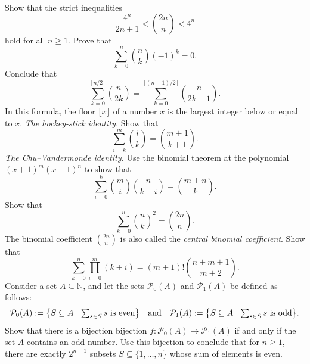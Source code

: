 \begin{routine}
  \exercise \label{exercise:estimates-central-binomial-coefficients}Show that the strict inequalities
  \begin{equation*}
    \frac{4^n}{2n+1} < \binom{2n}{n} < 4^n
  \end{equation*}
  hold for all $n\geq 1$.
  \exercise Prove that
  \begin{equation*}
    \sum_{k=0}^n\binom{n}{k}(-1)^k = 0.
  \end{equation*}
  Conclude that
  \begin{equation*}
    \sum_{k=0}^{\lfloor n/2\rfloor}\binom{n}{2k} =\sum_{k=0}^{\lfloor (n-1)/2\rfloor}\binom{n}{2k+1}.
  \end{equation*}
  In this formula, the floor $\lfloor x\rfloor$ of a number $x$ is the largest integer below or equal to $x$.
  \exercise \label{exercise:hockey-stick-identity}\emph{The hockey-stick identity.} Show that
  \begin{equation*}
    \sum_{i=k}^m\binom{i}{k}=\binom{m+1}{k+1}.
  \end{equation*}
  \exercise \emph{The Chu--Vandermonde identity.} Use the binomial theorem at the polynomial $(x+1)^m(x+1)^n$ to show that
  \begin{equation*}
    \sum_{i=0}^k \binom{m}{i}\binom{n}{k-i} = \binom{m+n}{k}.
  \end{equation*}
  \exercise Show that
  \begin{equation*}
    \sum_{k=0}^n \binom{n}{k}^2 = \binom{2n}{n}.
  \end{equation*}
  The binomial coefficient $\binom{2n}{n}$ is also called the \emph{central binomial coefficient}.
  \exercise Show that
  \begin{equation*}
    \sum_{k=0}^n\prod_{i=0}^m (k+i) = (m+1)!\binom{n+m+1}{m+2}.
  \end{equation*}
  \exercise Consider a set $A\subseteq \mathbb{N}$, and let the sets $\mathcal{P}_0(A)$ and $\mathcal{P}_1(A)$ be defined as follows:
  \begin{equation*}
    \mathcal{P}_0(A):=\big\{S\subseteq A\bigm| {\textstyle \sum_{s\in S}s}\text{ is even}\big\}\quad\text{and}\quad
    \mathcal{P}_1(A):=\big\{S\subseteq A\bigm| {\textstyle \sum_{s\in S}s}\text{ is odd}\big\}.
  \end{equation*}
  Show that there is a bijection bijection $f:\mathcal{P}_0(A)\to\mathcal{P}_1(A)$ if and only if the set $A$ contains an odd number. Use this bijection to conclude that for $n\geq 1$, there are exactly $2^{n-1}$ subsets $S\subseteq\{1,\ldots,n\}$ whose sum of elements is even.
\end{routine}

